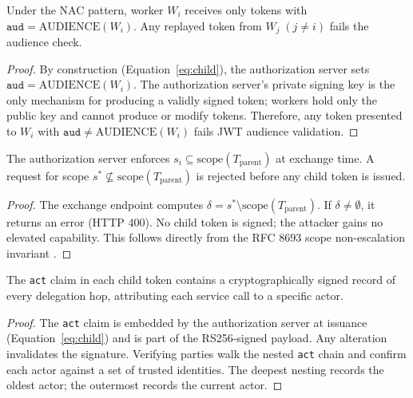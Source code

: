 \documentclass[journal]{IEEEtran}
\begin{document}
\begin{theorem}
Under the NAC pattern, worker $W_i$ receives only tokens with
$\texttt{aud} = \mathrm{AUDIENCE}(W_i)$. Any replayed token from $W_j\;
(j\neq i)$ fails the audience check.
\end{theorem}

\begin{proof}
By construction (Equation~\ref{eq:child}), the authorization server sets
$\texttt{aud} = \mathrm{AUDIENCE}(W_i)$. The authorization server's private
signing key is the only mechanism for producing a validly signed token; workers
hold only the public key and cannot produce or modify tokens. Therefore, any
token presented to $W_i$ with $\texttt{aud} \neq \mathrm{AUDIENCE}(W_i)$ fails
JWT audience validation.
\end{proof}

\begin{theorem}
The authorization server enforces $s_i \subseteq \mathrm{scope}(T_{\mathrm{parent}})$
at exchange time. A request for scope $s^* \not\subseteq \mathrm{scope}
(T_{\mathrm{parent}})$ is rejected before any child token is issued.
\end{theorem}

\begin{proof}
The exchange endpoint computes $\delta = s^* \setminus \mathrm{scope}(T_{\mathrm{parent}})$.
If $\delta \neq \emptyset$, it returns an error (HTTP 400). No child token is
signed; the attacker gains no elevated capability. This follows directly from the
RFC 8693 scope non-escalation invariant \cite{rfc8693}.
\end{proof}

\begin{theorem}
The \texttt{act} claim in each child token contains a cryptographically signed
record of every delegation hop, attributing each service call to a specific
actor.
\end{theorem}

\begin{proof}
The \texttt{act} claim is embedded by the authorization server at issuance
(Equation~\ref{eq:child}) and is part of the RS256-signed payload. Any alteration
invalidates the signature. Verifying parties walk the nested \texttt{act} chain
and confirm each actor against a set of trusted identities. The deepest nesting
records the oldest actor; the outermost records the current actor.
\end{proof}
\end{document}
